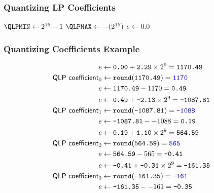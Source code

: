 \subsubsection{Quantizing LP Coefficients}
\label{alac:quantize_lp_coeffs}
$\QLPMIN \leftarrow 2 ^ \text{15} - 1$\;
$\QLPMAX \leftarrow -(2 ^ \text{15})$\;
$e \leftarrow 0.0$\;
\Return \QLPCOEFF\;
\EALGORITHM

\clearpage

\subsubsection{Quantizing Coefficients Example}
\begin{align*}
e &\leftarrow \texttt{0.00} + \texttt{2.29} \times 2 ^ 9 = \texttt{1170.49} \\
\textsf{QLP coefficient}_0 &\leftarrow \texttt{round}(\texttt{1170.49}) = \texttt{\color{blue}1170} \\
e &\leftarrow \texttt{1170.49} - 1170 = \texttt{0.49} \\
e &\leftarrow \texttt{0.49} + \texttt{-2.13} \times 2 ^ 9 = \texttt{-1087.81} \\
\textsf{QLP coefficient}_1 &\leftarrow \texttt{round}(\texttt{-1087.81}) = \texttt{\color{blue}-1088} \\
e &\leftarrow \texttt{-1087.81} - -1088 = \texttt{0.19} \\
e &\leftarrow \texttt{0.19} + \texttt{1.10} \times 2 ^ 9 = \texttt{564.59} \\
\textsf{QLP coefficient}_2 &\leftarrow\texttt{round}(\texttt{564.59}) = \texttt{\color{blue}565} \\
e &\leftarrow \texttt{564.59} - 565 = \texttt{-0.41} \\
e &\leftarrow \texttt{-0.41} + \texttt{-0.31} \times 2 ^ 9 = \texttt{-161.35} \\
\textsf{QLP coefficient}_3 &\leftarrow \texttt{round}(\texttt{-161.35}) = \texttt{\color{blue}-161} \\
e &\leftarrow \texttt{-161.35} - -161 = \texttt{-0.35} \\
\end{align*}

